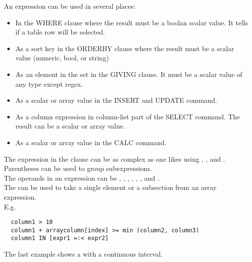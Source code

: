 An expression can be used in several places:
\begin{itemize}
\item In the WHERE clause where the result must be a boolan scalar value. It
tells if a table row will be selected.
\item As a sort key in the ORDERBY clause where the result must be a
  scalar value (numeric, bool, or string)
\item As an element in the set in the GIVING clause. It must be a
  scalar value of any type except regex.
\item As a scalar or array value in the INSERT and UPDATE command.
\item As a column expression in column-list part of the SELECT
  command. The result can be a scalar or array value.
\item As a scalar or array value in the CALC command.
\end{itemize}

The expression in the clause can be as complex as one likes using
, 
, and .
Parentheses can be used to group subexpressions.
\\The operands in an expression can be
,
,
,
,
,
, and
.
\\The {} can be used to take a
single element or a subsection from an array expression.
\\E.g.
\begin{verbatim}
  column1 > 10
  column1 + arraycolumn[index] >= min (column2, column3)
  column1 IN [expr1 =:< expr2]
\end{verbatim}
The last example shows a  with a continuous interval.

